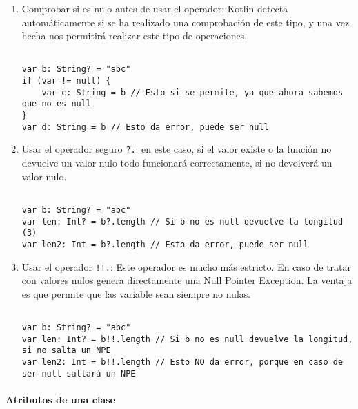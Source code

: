 \begin{enumerate}
	\item Comprobar si es nulo antes de usar el operador: Kotlin detecta automáticamente si se ha realizado una comprobación de este tipo, y una vez hecha nos permitirá realizar este tipo de operaciones.
	
\begin{verbatim}

var b: String? = "abc"
if (var != null) {
	var c: String = b // Esto si se permite, ya que ahora sabemos que no es null
}
var d: String = b // Esto da error, puede ser null

\end{verbatim}

	\item Usar el operador seguro \texttt{?.}: en este caso, si el valor existe o la función no devuelve un valor nulo todo funcionará correctamente, si no devolverá un valor nulo.
	
\begin{verbatim}

var b: String? = "abc"
var len: Int? = b?.length // Si b no es null devuelve la longitud (3)
var len2: Int = b?.length // Esto da error, puede ser null

\end{verbatim}

	\item Usar el operador \texttt{!!.}: Este operador es mucho más estricto. En caso de tratar con valores nulos genera directamente una Null Pointer Exception. La ventaja es que permite que las variable sean siempre no nulas.
	
\begin{verbatim}

var b: String? = "abc"
var len: Int? = b!!.length // Si b no es null devuelve la longitud, si no salta un NPE
var len2: Int = b!!.length // Esto NO da error, porque en caso de ser null saltará un NPE

\end{verbatim}

\end{enumerate}

\paragraph{Atributos de una clase}

